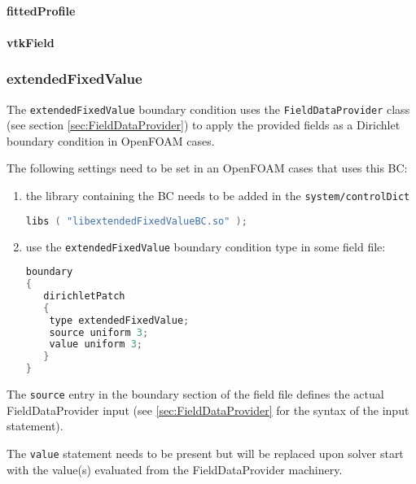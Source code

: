 \paragraph{fittedProfile}

\paragraph{vtkField}

\subsubsection{extendedFixedValue}

The \texttt{extendedFixedValue} boundary condition uses the \texttt{FieldDataProvider} class (see section \ref{sec:FieldDataProvider}) to apply the provided fields as a Dirichlet boundary condition in OpenFOAM cases.

The following settings need to be set in an OpenFOAM cases that uses this BC:

\begin{enumerate}
\item the library containing the BC needs to be added in the \texttt{system/controlDict}

\begin{lstlisting}[language=c++]
libs ( "libextendedFixedValueBC.so" );
\end{lstlisting}

\item use the \texttt{extendedFixedValue} boundary condition type in some field file:

\begin{lstlisting}[language=c++]
boundary
{
   dirichletPatch
   {
	type extendedFixedValue;
	source uniform 3;
	value uniform 3;
   }
}
\end{lstlisting}

\end{enumerate}

The \texttt{source} entry in the boundary section of the field file defines the actual FieldDataProvider input (see \ref{sec:FieldDataProvider} for the syntax of the input statement). 

The \texttt{value} statement needs to be present but will be replaced upon solver start with the value(s) evaluated from the FieldDataProvider machinery.